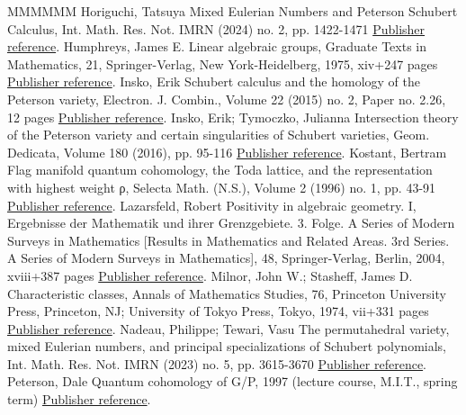 \begin{thebibliography}{MMMMMM}
 Horiguchi, Tatsuya Mixed Eulerian Numbers and Peterson Schubert Calculus, Int. Math. Res. Not. IMRN (2024) no. 2, pp. 1422-1471 \href{https://alco.centre-mersenne.org/articles/10.5802/alco.342/#Horiguchi21}{Publisher reference}.
 Humphreys, James E. Linear algebraic groups, Graduate Texts in Mathematics, 21, Springer-Verlag, New York-Heidelberg, 1975, xiv+247 pages \href{https://alco.centre-mersenne.org/articles/10.5802/alco.342/#Humphreys}{Publisher reference}.
 Insko, Erik Schubert calculus and the homology of the Peterson variety, Electron. J. Combin., Volume 22 (2015) no. 2, Paper no. 2.26, 12 pages \href{https://alco.centre-mersenne.org/articles/10.5802/alco.342/#Insko}{Publisher reference}.
 Insko, Erik; Tymoczko, Julianna Intersection theory of the Peterson variety and certain singularities of Schubert varieties, Geom. Dedicata, Volume 180 (2016), pp. 95-116 \href{https://alco.centre-mersenne.org/articles/10.5802/alco.342/#Insko-Tymoczko}{Publisher reference}.
 Kostant, Bertram Flag manifold quantum cohomology, the Toda lattice, and the representation with highest weight ρ, Selecta Math. (N.S.), Volume 2 (1996) no. 1, pp. 43-91 \href{https://alco.centre-mersenne.org/articles/10.5802/alco.342/#Kostant}{Publisher reference}.
 Lazarsfeld, Robert Positivity in algebraic geometry. I, Ergebnisse der Mathematik und ihrer Grenzgebiete. 3. Folge. A Series of Modern Surveys in Mathematics [Results in Mathematics and Related Areas. 3rd Series. A Series of Modern Surveys in Mathematics], 48, Springer-Verlag, Berlin, 2004, xviii+387 pages \href{https://alco.centre-mersenne.org/articles/10.5802/alco.342/#Lazarsfeld}{Publisher reference}.
 Milnor, John W.; Stasheff, James D. Characteristic classes, Annals of Mathematics Studies, 76, Princeton University Press, Princeton, NJ; University of Tokyo Press, Tokyo, 1974, vii+331 pages \href{https://alco.centre-mersenne.org/articles/10.5802/alco.342/#Milnor-Stasheff}{Publisher reference}.
 Nadeau, Philippe; Tewari, Vasu The permutahedral variety, mixed Eulerian numbers, and principal specializations of Schubert polynomials, Int. Math. Res. Not. IMRN (2023) no. 5, pp. 3615-3670 \href{https://alco.centre-mersenne.org/articles/10.5802/alco.342/#Nadeau-Tewari}{Publisher reference}.
 Peterson, Dale Quantum cohomology of G/P, 1997 (lecture course, M.I.T., spring term) \href{https://alco.centre-mersenne.org/articles/10.5802/alco.342/#Peterson}{Publisher reference}.

\end{thebibliography}
